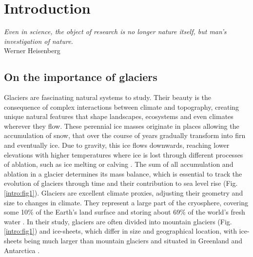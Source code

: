 \chapter{Introduction}
\label{chap:intro}

\begin{flushright}
\begin{small}
\textit{Even in science, the object of research is no longer nature itself, but man's investigation of nature.}\\
Werner Heisenberg
\end{small}
\end{flushright}

\section{On the importance of glaciers}

Glaciers are fascinating natural systems to study. Their beauty is the consequence of complex interactions between climate and topography, creating  unique natural features that shape landscapes, ecosystems and even climates wherever they flow. These perennial ice masses originate in places allowing the accumulation of snow, that over the course of years gradually transform into firn and eventually ice. Due to gravity, this ice flows downwards, reaching lower elevations with higher temperatures where ice is lost through different processes of ablation, such as ice melting or calving \citep{ipcc_climate_2018}. The sum of all accumulation and ablation in a glacier determines its mass balance, which is essential to track the evolution of glaciers through time and their contribution to sea level rise (Fig. \ref{intro:fig1}). Glaciers are excellent climate proxies, adjusting their geometry and size to changes in climate. They represent a large part of the cryosphere, covering some 10\% of the Earth's land surface and storing about 69\% of the world's fresh water \citep{cuffey_physics_2010}. In their study, glaciers are often divided into mountain glaciers (Fig. \ref{intro:fig1}) and ice-sheets, which differ in size and geographical location, with ice-sheets being much larger than mountain glaciers and situated in Greenland and Antarctica \citep{benn_glaciers_2014}.  

